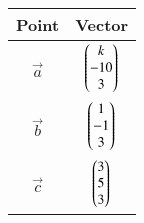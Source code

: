 \begin{tabular}{|c|c|}
\hline
Point & Vector \\
\hline
$\vec{a}$ & $\begin{pmatrix}k \\ -10 \\ 3\end{pmatrix}$ \\
\hline
$\vec{b}$ & $\begin{pmatrix}1 \\ -1 \\ 3\end{pmatrix}$ \\
\hline
$\vec{c}$ & $\begin{pmatrix}3 \\ 5 \\ 3\end{pmatrix}$ \\
\hline
\end{tabular}
